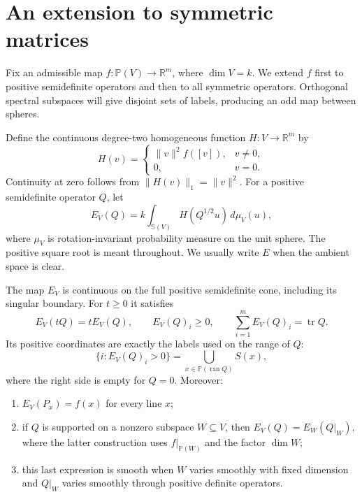\section{An extension to symmetric matrices}
\label{sec:extension}

Fix an admissible map $f:\mathbb P(V)\to\mathbb R^m$, where
$\dim V=k$.  We extend $f$ first to positive semidefinite operators and
then to all symmetric operators.  Orthogonal spectral subspaces will give
disjoint sets of labels, producing an odd map between spheres.

Define the continuous degree-two homogeneous function
$H:V\to\mathbb R^m$ by
\[
 H(v)=\begin{cases}\|v\|^2f([v]),&v\ne0,\\0,&v=0.\end{cases}
\]
Continuity at zero follows from $\|H(v)\|_1=\|v\|^2$.
For a positive semidefinite operator $Q$, let
\begin{equation}
 E_V(Q)=k\int_{\mathbb S(V)}H(Q^{1/2}u)\,d\mu_V(u),
 \label{eq:extension}
\end{equation}
where $\mu_V$ is rotation-invariant probability measure on the unit sphere.
The positive square root is meant throughout.  We usually write $E$
when the ambient space is clear.

\begin{lemma}
\label{lem:positive-extension}
The map $E_V$ is continuous on the full positive semidefinite cone,
including its singular boundary.  For $t\geq0$ it satisfies
\[
 E_V(tQ)=tE_V(Q),\qquad E_V(Q)_i\geq0,\qquad
 \sum_{i=1}^m E_V(Q)_i=\operatorname{tr}Q.
\]
Its positive coordinates are exactly the labels used on the range of $Q$:
\begin{equation}
 \{i:E_V(Q)_i>0\}
 =\bigcup_{x\in\mathbb P(\operatorname{ran}Q)}S(x),
 \label{eq:extension-support}
\end{equation}
where the right side is empty for $Q=0$.  Moreover:
\begin{enumerate}
\item $E_V(P_x)=f(x)$ for every line $x$;
\item if $Q$ is supported on a nonzero subspace $W\subseteq V$, then
$E_V(Q)=E_W(Q|_W)$, where the latter construction uses $f|_{\mathbb P(W)}$
and the factor $\dim W$;
\item this last expression is smooth when $W$ varies smoothly with fixed
dimension and $Q|_W$ varies smoothly through positive definite operators.
\end{enumerate}
\end{lemma}

